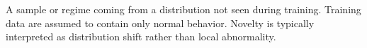 \documentclass[a4paper]{article}
\title{}
\date{}
\begin{document}
    \maketitle
    
    A sample or regime coming from a distribution not seen during training.
    Training data are assumed to contain only normal behavior.
    Novelty is typically interpreted as distribution shift rather than local abnormality.
\end{document}
